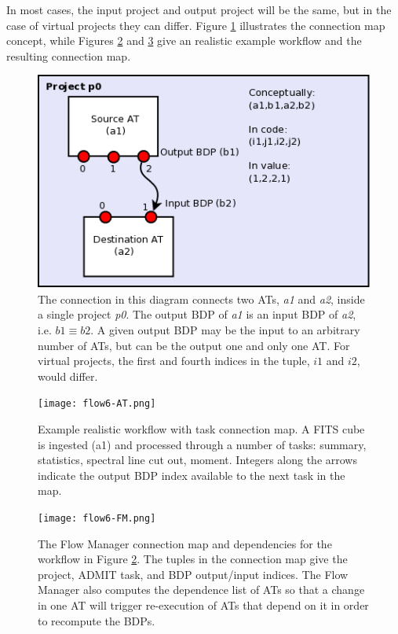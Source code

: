 \documentclass[preprint]{aastex}
\begin{document}
\noindent In most cases, the input project and output project will be the 
same, but in the case of virtual projects they can differ.
Figure \ref{connection} illustrates the connection map concept,
while Figures \ref{flow6-AT} and \ref{flow6-FM} give an realistic example workflow and the resulting connection map.
\begin{figure}[H]
\begin{center}
\includegraphics[scale=0.5]{connection.png}
\end{center}
\caption{The connection in this diagram connects two ATs, {\it a1} and
{\it a2},  inside a single project {\it p0}.   The output BDP of {\it a1}
is an input BDP of {\it a2}, i.e. $b1 \equiv b2$.   A given output BDP
may be the input to an arbitrary number of ATs, but can be the
output one and only one AT.   For virtual projects, the first and fourth
indices in the tuple, $i1$ and $i2$, would differ.
}
\label{connection}
\end{figure}
\clearpage

\begin{figure}[H]
\begin{center}
\texttt{[image: flow6-AT.png]}
\end{center}
\caption{Example realistic workflow with task connection map. A FITS cube is
ingested (a1) and processed through a number of tasks: summary,
statistics, spectral line cut out, moment. Integers along the arrows
indicate the output BDP index available to the next task in the map.}
\label{flow6-AT}
\end{figure}

\begin{figure}[H]
\begin{center}
\texttt{[image: flow6-FM.png]}
\end{center}
\caption{The Flow Manager connection map and dependencies for the workflow
in Figure \ref{flow6-AT}. The tuples in the connection map give the
project, ADMIT task, and BDP output/input indices. The Flow Manager also
computes the dependence list of ATs so that a change in one AT will trigger
re-execution of ATs that depend on it in order to recompute the BDPs.}
\label{flow6-FM}
\end{figure}
\end{document}
